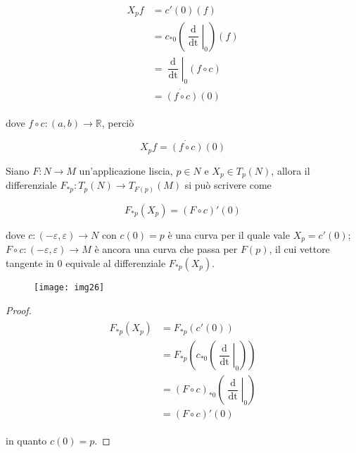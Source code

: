 \begin{align}
	\begin{split}
		X_{p} f &= c'(0) (f)\\
		&= c_{*0} \left( \left. \dfrac{\operatorname{d}}{\operatorname{dt}} \right|_{0} \right) (f)\\
		&= \left. \dfrac{\operatorname{d}}{\operatorname{dt}} \right|_{0} (f \circ c)\\
		&= \dot{(f \circ c)}(0)
	\end{split}
\end{align}

dove $ f \circ c : (a,b) \to \mathbb{R} $, perciò

\begin{equation}
	X_{p} f = \dot{(f \circ c)}(0)
\end{equation}

\begin{definition}
	Siano $ F : N \to M $ un'applicazione liscia, $ p \in N $ e $ X_{p} \in T_{p}(N) $, allora il differenziale $ F_{*p} : T_{p}(N) \to T_{F(p)}(M) $ si può scrivere come
	
	\begin{equation}
		F_{*p}(X_{p}) = (F \circ c)' (0)
	\end{equation}

	dove $ c : (-\varepsilon,\varepsilon) \to N $ con $ c(0) = p $ è una curva per il quale vale $ X_{p} = c'(0) $; $ F \circ c : (-\varepsilon,\varepsilon) \to M $ è ancora una curva che passa per $ F(p) $, il cui vettore tangente in 0 equivale al differenziale $ F_{*p}(X_{p}) $.
	
	\begin{figure}[H]
		\centering
		\texttt{[image: img26]}
	\end{figure}
\end{definition}

\begin{proof}
	\begin{align}
		\begin{split}
			F_{*p}(X_{p}) &= F_{*p}(c'(0))\\
			&= F_{*p} \left( c_{*0} \left( \left. \dfrac{\operatorname{d}}{\operatorname{dt}} \right|_{0} \right) \right)\\
			&= (F \circ c)_{*0} \left( \left. \dfrac{\operatorname{d}}{\operatorname{dt}} \right|_{0} \right)\\
			&= (F \circ c)' (0)
		\end{split}
	\end{align}

	in quanto $ c(0)=p $.
\end{proof}


